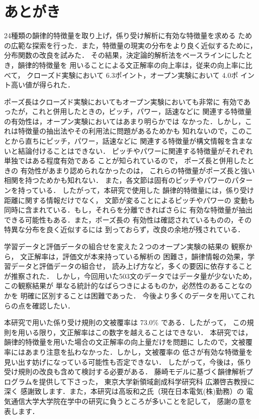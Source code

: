 \section{あとがき}
24種類の韻律的特徴量を取り上げ，係り受け解析に有効な特徴量を求める
ための広範な探索を行った．また，特徴量の現実の分布をより良く近似するために，
分布関数の改良を試みた．
その結果，決定論的解析法をベースラインにしたとき，韻律的特徴量を
用いることによる文正解率の向上率は，従来の向上率に比べて，
クローズド実験において 6.3ポイント，オープン実験において 4.0ポ
イント高い値が得られた．

ポーズ長はクローズド実験においてもオープン実験においても非常に
有効であったが，これと併用したときの，ピッチ，パワー，話速などに
関連する特徴量の有効性は，オープン実験においてはあまり明らかでは
なかった．しかし，これは特徴量の抽出法やその利用法に問題があるためかも
知れないので，このことから直ちにピッチ，パワー，話速などに
関連する特徴量が構文情報を含まないと結論付けることはできない．
ピッチやパワーに関連する特徴量がそれぞれ単独ではある程度有効である
ことが知られている\cite{EGU,OZE-3}ので，
ポーズ長と併用したときの
有効性があまり認められなかったのは，
これらの特徴量がポーズ長と強い相関を持つためかも知れない．
また，各文節は固有のピッチやパワーのパターンを持っている．
したがって，本研究で使用した
韻律的特徴量には，係り受け距離に関する情報だけでなく，
文節が変ることによるピッチやパワーの
変動も同時に含まれている．もし，それらを分離できればさらに
有効な特徴量が抽出できる可能性もある．また，ポーズ長の
有効性は確認されているものの，その特異な分布を良く近似するには
到っておらず，改良の余地が残されている．

学習データと評価データの組合せを変えた２つのオープン実験の結果の
観察から，
文正解率は，評価文が本来持っている解析の
困難さ，韻律情報の効果，学習データと評価データの組合せ，
読み上げ方など，多くの要因に依存することが推察された．
しかし，今回用いた503文のデータではデータ量が少ないため，
この観察結果が
単なる統計的なばらつきによるものか，必然性のあることなのかを
明確に区別することは困難であった．
今後より多くのデータを用いてこれらの点を確認したい．

本研究で用いた係り受け規則の文被覆率は 73.0\% である．したがって，
この規則を用いる限り，文正解率はこの数字を越えることはできない．
本研究では，韻律的特徴量を用いた場合の文正解率の向上量だけを問題に
したので，文被覆率にはあまり注意を払わなかった．しかし，文被覆率の
低さが有効な特徴量を見い出す妨げになっている可能性も否定できない．
したがって，今後は，係り受け規則の改良も含めて検討する必要がある．
\vspace{5mm}
\acknowledgment
藤崎モデルに基づく韻律解析プログラムを提供して下さった，
東京大学新領域創成科学研究科 広瀬啓吉教授に深く
感謝致します．また，本研究は高坂和之氏（現在日本電気(株)勤務）の
電気通信大学大学院在学中の研究に負うところが多いことを記して，
感謝の意を表します．



